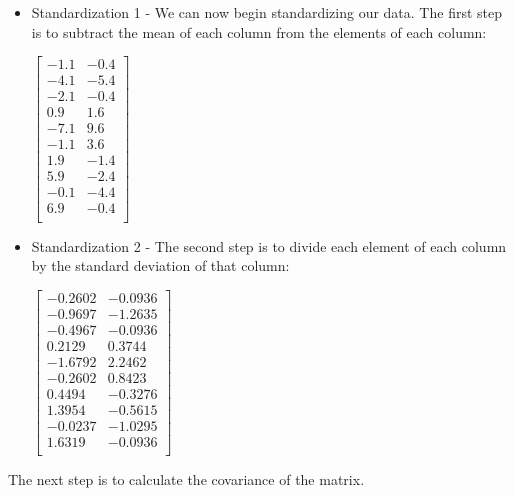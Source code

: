 \documentclass[12pt]{article}
\begin{document}
\begin{itemize}
    \item
    Standardization 1 - We can now begin standardizing our data. The first step is to subtract the mean of each column from the elements of each column:\\
    \begin{center}
        $\begin{bmatrix}
            -1.1 & -0.4\\
            -4.1 & -5.4\\
            -2.1 & -0.4\\
            0.9 & 1.6\\
            -7.1 & 9.6\\
            -1.1 & 3.6\\
            1.9 & -1.4\\
            5.9 & -2.4\\
            -0.1 & -4.4\\
            6.9 & -0.4\\
        \end{bmatrix}$
    \end{center}
    
    \item
    Standardization 2 - The second step is to divide each element of each column by the standard deviation of that column:\\
    \begin{center}
        $\begin{bmatrix}
            -0.2602 & -0.0936\\
            -0.9697 & -1.2635\\
            -0.4967 & -0.0936\\
            0.2129 & 0.3744\\
            -1.6792 & 2.2462\\
            -0.2602 & 0.8423\\
            0.4494 & -0.3276\\
            1.3954 & -0.5615\\
            -0.0237 & -1.0295\\
            1.6319 & -0.0936\\
        \end{bmatrix}$
    \end{center}
\end{itemize}

\noindent
The next step is to calculate the covariance of the matrix.
\end{document}
